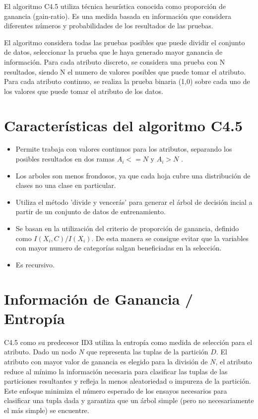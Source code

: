 El algoritmo C4.5 utiliza técnica heurística conocida como proporción de ganancia (gain-ratio). Es una medida basada en información que considera diferentes números y probabilidades de los resultados de las pruebas. 

El algoritmo considera todas las pruebas posibles que puede dividir el conjunto de datos, seleccionar la prueba que le haya generado mayor ganancia de información. Para cada atributo discreto, se considera una prueba con N resultados, siendo N el numero de valores posibles que puede tomar el atributo. Para cada atributo continuo, se realiza la prueba binaria (1,0) sobre cada uno de los valores que puede tomar el atributo de los datos.

\section{Características del algoritmo C4.5}
\begin{itemize}
	\item Permite trabaja con valores continuos para los atributos, separando los posibles resultados en dos ramas $ A_{i} <= N $ y $ A_{i} > N $ . 
	\item Los arboles son menos frondosos, ya que cada hoja cubre una distribución de clases no una clase en particular.
	\item Utiliza el método 'divide y vencerás' para generar el árbol de decisión incial a partir de un conjunto de datos de entrenamiento.
	\item Se basan en la utilización del criterio de proporción de ganancia, definido como $ I(X_{i},C) / I(X_{i})  $. De esta manera se consigue evitar que la variables con mayor numero de categorías salgan beneficiadas en la selección. 
	\item Es recursivo.
\end{itemize}

\section{Información de Ganancia / Entropía }
C4.5 como su predecesor ID3 utiliza la entropía como medida de selección para el atributo. 
Dado un nodo $N$ que representa las tuplas de la partición $D$. El atributo con mayor valor de ganancia es elegido para la división de $N$, el atributo reduce al mínimo la información necesaria para clasificar las tuplas de las particiones resultantes y refleja la menos aleatoriedad o impureza de la partición. Este enfoque minimiza el número esperado de los ensayos necesarios para clasificar una tupla dada y garantiza que un árbol simple (pero no necesariamente el más simple) se encuentre.

